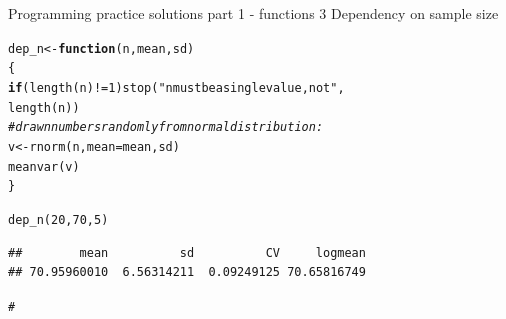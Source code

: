 \documentclass[xcolor=table,       handout,    xcolor=dvipsnames]{beamer}\usepackage[]{graphicx}\usepackage[]{color}
\makeatletter
\newcommand{\hlnum}[1]{\textcolor[rgb]{0,0,0}{#1}}
\newcommand{\hlstr}[1]{\textcolor[rgb]{0.545,0.137,0.137}{#1}}
\newcommand{\hlcom}[1]{\textcolor[rgb]{0,0.392,0}{\textit{#1}}}
\newcommand{\hlopt}[1]{\textcolor[rgb]{0,0,0}{#1}}
\newcommand{\hlstd}[1]{\textcolor[rgb]{0,0,0}{#1}}
\newcommand{\hlkwa}[1]{\textcolor[rgb]{1,0,0}{\textbf{#1}}}
\newcommand{\hlkwb}[1]{\textcolor[rgb]{0,0,0}{#1}}
\newcommand{\hlkwc}[1]{\textcolor[rgb]{1,0,1}{#1}}
\newcommand{\hlkwd}[1]{\textcolor[rgb]{0,0,1}{#1}}
\newenvironment{kframe}{%
 \def\at@end@of@kframe{}%
 \ifinner\ifhmode%
  \def\at@end@of@kframe{\end{minipage}}%
  \begin{minipage}{\columnwidth}%
 \fi\fi%
 \def\FrameCommand##1{\hskip\@totalleftmargin \hskip-\fboxsep
 \colorbox{shadecolor}{##1}\hskip-\fboxsep
     \hskip-\linewidth \hskip-\@totalleftmargin \hskip\columnwidth}%
 \MakeFramed {\advance\hsize-\width
   \@totalleftmargin\z@ \linewidth\hsize
   \@setminipage}}%
 {\par\unskip\endMakeFramed%
 \at@end@of@kframe}
\newenvironment{knitrout}{}{} %
\makeatother
\begin{document}
\begin{frame}[fragile]{Programming practice solutions part 1 - functions 3}
Dependency on sample size
\begin{knitrout}
\color{fgcolor}\begin{kframe}
\begin{alltt}
\hlstd{dep_n} \hlkwb{<-} \hlkwa{function}\hlstd{(}\hlkwc{n}\hlstd{,} \hlkwc{mean}\hlstd{,} \hlkwc{sd}\hlstd{)}
  \hlstd{\{}
  \hlkwa{if}\hlstd{(}\hlkwd{length}\hlstd{(n)}\hlopt{!=}\hlnum{1}\hlstd{)} \hlkwd{stop}\hlstd{(}\hlstr{"n must be a single value, not "}\hlstd{,}
                        \hlkwd{length}\hlstd{(n))}
  \hlcom{# draw n numbers randomly from normal distribution:}
  \hlstd{v} \hlkwb{<-} \hlkwd{rnorm}\hlstd{(n,} \hlkwc{mean}\hlstd{=mean, sd)}
  \hlkwd{meanvar}\hlstd{(v)}
  \hlstd{\}}

\hlkwd{dep_n}\hlstd{(}\hlnum{20}\hlstd{,} \hlnum{70}\hlstd{,}\hlnum{5}\hlstd{)}
\end{alltt}
\begin{verbatim}
##        mean          sd          CV     logmean 
## 70.95960010  6.56314211  0.09249125 70.65816749
\end{verbatim}
\begin{alltt}
\hlcom{#}
\end{alltt}
\end{kframe}
\end{knitrout}

\end{frame}

\end{document}
